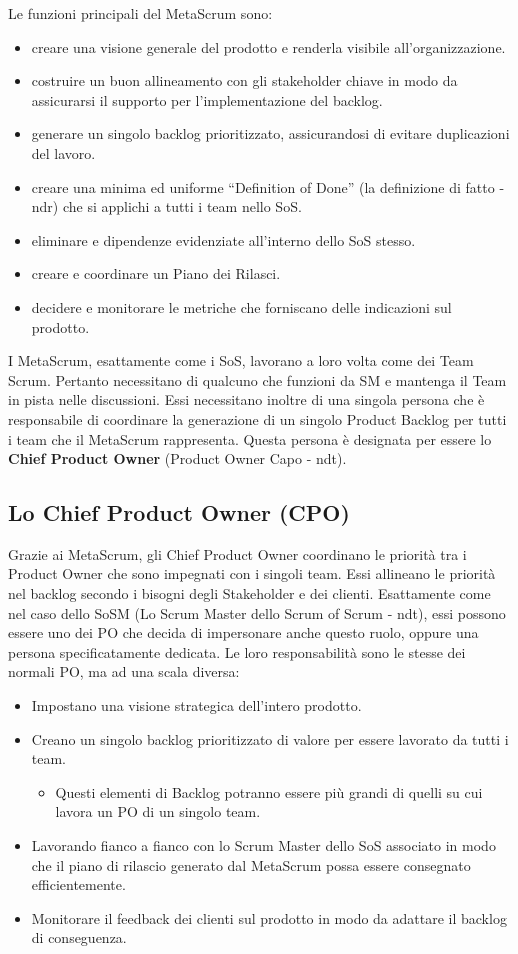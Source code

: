 \documentclass[italian,12pt,a4paper,parskip=full]{scrartcl}
\begin{document}
Le funzioni principali del MetaScrum sono:
\begin{itemize}
\item creare una visione generale del prodotto e renderla visibile all'organizzazione.
\item costruire un buon allineamento con gli stakeholder chiave in modo da assicurarsi il supporto per l'implementazione del backlog.
\item generare un singolo backlog prioritizzato, assicurandosi di evitare duplicazioni del lavoro.
\item creare una minima ed uniforme ``Definition of Done'' (la definizione di fatto - ndr) che si applichi a tutti i team nello SoS.
\item eliminare e dipendenze evidenziate all'interno dello SoS stesso.
\item creare e coordinare un Piano dei Rilasci.
\item decidere e monitorare le metriche che forniscano delle indicazioni sul prodotto.
\end{itemize}
I MetaScrum, esattamente come i SoS, lavorano a loro volta come dei Team Scrum. Pertanto necessitano di qualcuno che funzioni da SM e mantenga il Team in pista nelle discussioni. Essi necessitano inoltre di una singola persona che è responsabile di coordinare la generazione di un singolo Product Backlog per tutti i team che il MetaScrum rappresenta. Questa persona è designata per essere lo \textbf{Chief Product Owner} (Product Owner Capo - ndt).

\subsection{Lo Chief Product Owner (CPO)}
Grazie ai MetaScrum, gli Chief Product Owner coordinano le priorità tra i Product Owner che sono impegnati con i singoli team. Essi allineano le priorità nel backlog secondo i bisogni degli Stakeholder e dei clienti. Esattamente come nel caso dello SoSM (Lo Scrum Master dello Scrum of Scrum - ndt), essi possono essere uno dei PO che decida di impersonare anche questo ruolo, oppure una persona specificatamente dedicata. Le loro responsabilità sono le stesse dei normali PO, ma ad una scala diversa: 
\begin{itemize}
\item Impostano una visione strategica dell'intero prodotto.
\item Creano un singolo backlog prioritizzato di valore per essere lavorato da tutti i team.
\begin{itemize}
\item Questi elementi di Backlog potranno essere più grandi di quelli su cui lavora un PO di un singolo team.
\end{itemize}
\item Lavorando fianco a fianco con lo Scrum Master dello SoS associato in modo che il piano di rilascio generato dal MetaScrum possa essere consegnato efficientemente.
\item Monitorare il feedback dei clienti sul prodotto in modo da adattare il backlog di conseguenza.
\end{itemize}
\end{document}
